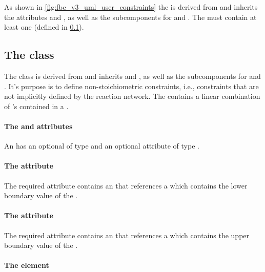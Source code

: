 As shown in \ref{fig:fbc_v3_uml_user_constraints} the \ListOfUserConstraints is derived from \SBase
and inherits the attributes  and , as well as
the subcomponents for \Annotation and \Notes. The
\ListOfUserConstraints must contain at least one \UserConstraint (defined in
\ref{userconstraint-class}).

\subsection{The \FBC {} class}
\label{userconstraint-class}

The \FBC \UserConstraint class is derived from \SBML \SBase and inherits
 and , as well as the subcomponents for
\Annotation and \Notes. It's purpose is to define non-stoichiometric constraints, i.e., constraints that are not implicitly defined by the reaction network. The \UserConstraint contains a linear combination of \UserConstraintComponent's contained in a \ListOfUserConstraintComponents.

\paragraph{The  and  attributes}
An \UserConstraint has an optional  of type
 and an optional attribute  of type .

\paragraph{The  attribute}
The required  attribute contains an  that references a \Parameter which contains the lower boundary value of the \UserConstraint.

\paragraph{The  attribute}
The required  attribute contains an  that references a \Parameter which contains the upper boundary value of the \UserConstraint.

\paragraph{The  element}
\label{listofuserconstraintcomponents-class}

